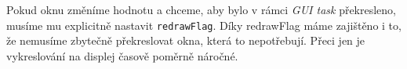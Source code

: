 Pokud oknu změníme hodnotu a chceme, aby bylo v rámci \emph{GUI task} překresleno, musíme mu explicitně
nastavit \texttt{redrawFlag}.
Díky redrawFlag máme zajištěno i to, že nemusíme zbytečně překreslovat okna, která to nepotřebují.
Přeci jen je vykreslování na displej časově poměrně náročné.

